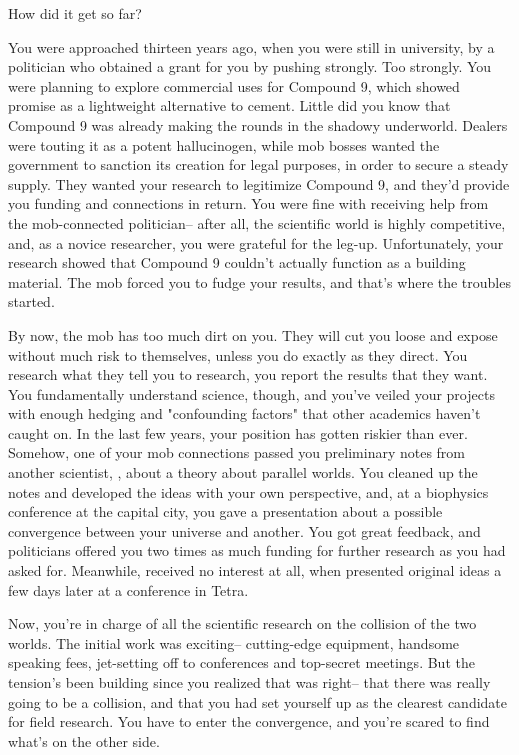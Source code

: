 \documentclass[char]{guildcamp3}
\begin{document}
\name{\cSciOne{}}


\updatemacro{\cNPC}{
  \unknownplayer %
  }

How did it get so far?

You were approached thirteen years ago, when you were still in university, by a politician who obtained a grant for you by pushing strongly. Too strongly. You were planning to explore commercial uses for Compound 9, which showed promise as a lightweight alternative to cement. Little did you know that Compound 9 was already making the rounds in the shadowy underworld. Dealers were touting it as a potent hallucinogen, while mob bosses wanted the government to sanction its creation for legal purposes, in order to secure a steady supply. They wanted your research to legitimize Compound 9, and they'd provide you funding and connections in return. You were fine with receiving help from the mob-connected politician-- after all, the scientific world is highly competitive, and, as a novice researcher, you were grateful for the leg-up. Unfortunately, your research showed that Compound 9 couldn't actually function as a building material. The mob forced you to fudge your results, and that's where the troubles started.

By now, the mob has too much dirt on you. They will cut you loose and expose without much risk to themselves, unless you do exactly as they direct. You research what they tell you to research, you report the results that they want. You fundamentally understand science, though, and you've veiled your projects with enough hedging and "confounding factors" that other academics haven't caught on. In the last few years, your position has gotten riskier than ever. Somehow, one of your mob connections passed you preliminary notes from another scientist, \cSciTwo{}, about a theory about parallel worlds. You cleaned up the notes and developed the ideas with your own perspective, and, at a biophysics conference at the capital city, you gave a presentation about a possible convergence between your universe and another. You got great feedback, and politicians offered you two times as much funding for further research as you had asked for. Meanwhile, \cSciTwo{} received no interest at all, when \cSciTwo{\they} presented \cSciTwo{\their} original ideas a few days later at a conference in Tetra.

Now, you're in charge of all the scientific research on the collision of the two worlds. The initial work was exciting-- cutting-edge equipment, handsome speaking fees, jet-setting off to conferences and top-secret meetings. But the tension's been building since you realized that \cSciTwo{} was right-- that there was really going to be a collision, and that you had set yourself up as the clearest candidate for field research. You have to enter the convergence, and you're scared to find what's on the other side.
\end{document}
